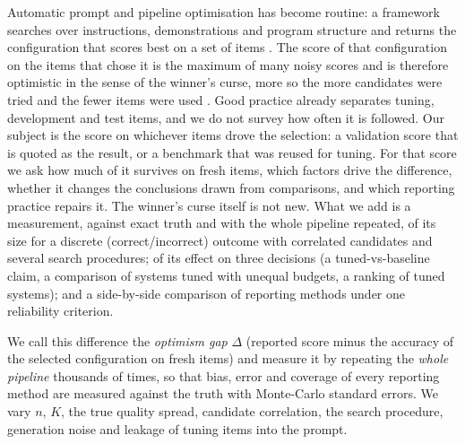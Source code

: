 Automatic prompt and pipeline optimisation has become routine: a framework searches over instructions, demonstrations and program structure and returns the configuration that scores best on a set of items \citep{khattab2023dspy,opsahlong2024mipro}. The score of that configuration on the items that chose it is the maximum of many noisy scores and is therefore optimistic in the sense of the winner's curse, more so the more candidates were tried and the fewer items were used \citep{cawley2010overfitting,dwork2015preserving}. Good practice already separates tuning, development and test items, and we do not survey how often it is followed. Our subject is the score on whichever items drove the selection: a validation score that is quoted as the result, or a benchmark that was reused for tuning. For that score we ask how much of it survives on fresh items, which factors drive the difference, whether it changes the conclusions drawn from comparisons, and which reporting practice repairs it. The winner's curse itself is not new. What we add is a measurement, against exact truth and with the whole pipeline repeated, of its size for a discrete (correct/incorrect) outcome with correlated candidates and several search procedures; of its effect on three decisions (a tuned-vs-baseline claim, a comparison of systems tuned with unequal budgets, a ranking of tuned systems); and a side-by-side comparison of reporting methods under one reliability criterion.

We call this difference the \emph{optimism gap} $\Delta$ (reported score minus the accuracy of the selected configuration on fresh items) and measure it by repeating the \emph{whole pipeline} thousands of times, so that bias, error and coverage of every reporting method are measured against the truth with Monte-Carlo standard errors. We vary $n$, $K$, the true quality spread, candidate correlation, the search procedure, generation noise and leakage of tuning items into the prompt.

